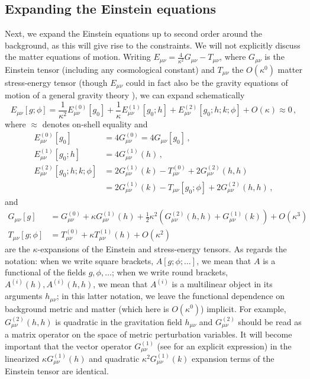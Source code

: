 \documentclass[]{jkpaper}
\theoremstyle{plain}
\theoremstyle{definition}
\begin{document}
\subsection{Expanding the Einstein equations}

Next, we expand the Einstein equations up to second order around the background, as this will give rise to the constraints. We will not explicitly discuss the matter equations of motion. Writing $E_{\mu \nu}=\frac{4}{\kappa^2}G_{\mu \nu}-T_{\mu \nu}$, where $G_{\mu \nu}$ is the Einstein tensor (including any cosmological constant) and $T_{\mu \nu}$ the $O(\kappa^0)$ matter stress-energy tensor (though $E_{\mu \nu}$ could in fact also be the gravity equations of motion of a general gravity theory \cite{Altas:2017fcp,Altas:2018dci}), we can expand schematically
\begin{equation}
    E_{\mu \nu}[g;\phi]=\frac{1}{\kappa^2}E^{(0)}_{\mu \nu}[g_0]+\frac{1}{\kappa}E^{(1)}_{\mu \nu}[g_0;h]+E_{\mu \nu}^{(2)}[g_0;h;k;\phi]+O(\kappa)\approx 0\,,
\end{equation}
where $\approx$ denotes on-shell equality and 
\begin{equation}\label{eoms}
\begin{aligned}
    E_{\mu \nu}^{(0)}[g_0]&=4G_{\mu \nu}^{(0)}=4G_{\mu \nu}[g_0]\,,\\
    E_{\mu \nu}^{(1)}[g_0;h]&=4G^{(1)}_{\mu \nu}(h)\,,\\
    E_{\mu \nu}^{(2)}[g_0;h;k;\phi]&=2G^{(1)}_{\mu \nu}(k)-T^{(0)}_{\mu \nu}+2G_{\mu \nu}^{(2)}(h,h)\\
    &=2G^{(1)}_{\mu \nu}(k)-T_{\mu \nu}[g_0;\phi]+2G_{\mu \nu}^{(2)}(h,h)\,,
\end{aligned}
\end{equation}
and 
\begin{equation}\label{Einsteintensor}
\begin{aligned}
    G_{\mu \nu}[g]&=G_{\mu \nu}^{(0)}+\kappa G^{(1)}_{\mu \nu}(h)+\frac{1}{2}\kappa^2\left(G_{\mu \nu}^{(2)}(h,h)+G^{(1)}_{\mu \nu}(k)\right)+O(\kappa^3)\\
    T_{\mu \nu}[g;\phi]&=T^{(0)}_{\mu \nu}+\kappa T^{(1)}_{\mu \nu}(h)+O(\kappa^2)
\end{aligned}
\end{equation}
are the $\kappa$-expansions of the Einstein and stress-energy tensors. As regards the notation: when we write square brackets, $A[g;\phi;\ldots]$, we mean that $A$ is a functional of the fields $g,\phi,\ldots$; when we write round brackets, $A^{(i)}(h),A^{(i)}(h,h)$, we mean that $A^{(i)}$ is a multilinear object in its arguments $h_{\mu \nu}$; in this latter notation, we leave the functional dependence on background metric and matter (which here is $O(\kappa^0)$) implicit. For example, $G^{(2)}_{\mu \nu}(h,h)$ is quadratic in the gravitation field $h_{\mu \nu}$ and $G^{(2)}_{\mu \nu}$ should be read as a matrix operator on the space of  metric perturbation variables. It will become important that the vector operator $G^{(1)}_{\mu \nu}$ (see \cite[Sec.\ 1]{fischer1980structure} for an explicit expression) in the linearized $\kappa G^{(1)}_{\mu \nu}(h)$ and quadratic $\kappa^2 G^{(1)}_{\mu \nu}(k)$ expansion terms of the Einstein tensor are identical.
\end{document}

